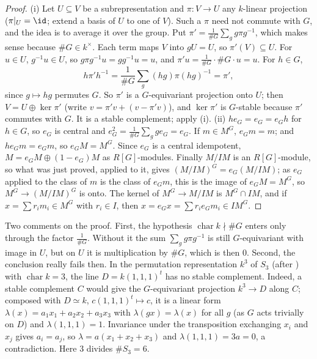 \begin{proof}
(i) Let $U\subseteq V$ be a subrepresentation and $\pi\colon V\to U$ any $k$-linear projection ($\pi|_U=\id$; extend a basis of $U$ to one of
$V$). Such a $\pi$ need not commute with $G$, and the idea is to average it over the group. Put $\pi'=\frac1{\#G}\sum_gg\pi g^{-1}$, which makes
sense because $\#G\in k^\times$. Each term maps $V$ into $gU=U$, so $\pi'(V)\subseteq U$. For $u\in U$, $g^{-1}u\in U$, so $g\pi g^{-1}u=gg^{-1}u=u$, and
$\pi'u=\frac1{\#G}\cdot\#G\cdot u=u$. For $h\in G$,
\[
h\pi'h^{-1}=\frac1{\#G}\sum_g(hg)\pi(hg)^{-1}=\pi',
\]
since $g\mapsto hg$ permutes $G$. So $\pi'$ is a $G$-equivariant projection onto $U$; then $V=U\oplus\ker\pi'$ (write $v=\pi'v+(v-\pi'v)$), and
$\ker\pi'$ is $G$-stable because $\pi'$ commutes with $G$. It is a stable complement; apply (i).
(ii) $he_G=e_G=e_Gh$ for $h\in G$, so $e_G$ is central and $e_G^2=\frac1{\#G}\sum_gge_G=e_G$. If $m\in M^G$, $e_Gm=m$; and $he_Gm=e_Gm$, so
$e_GM=M^G$. Since $e_G$ is a central idempotent, $M=e_GM\oplus(1-e_G)M$ as $R[G]$-modules. Finally $M/IM$ is an $R[G]$-module, so what was just proved, applied to it, gives
$(M/IM)^G=e_G(M/IM)$; as $e_G$ applied to the class of $m$ is the class of $e_Gm$, this is the image of $e_GM=M^G$, so $M^G\to(M/IM)^G$ is onto.
The kernel of $M^G\to M/IM$ is $M^G\cap IM$, and if $x=\sum r_im_i\in M^G$ with $r_i\in I$, then
$x=e_Gx=\sum r_ie_Gm_i\in IM^G$.
\end{proof}

Two comments on the proof. First, the hypothesis $\operatorname{char}k\nmid\#G$ enters only through the factor $\frac1{\#G}$. Without it the sum
$\sum_gg\pi g^{-1}$ is still $G$-equivariant with image in $U$, but on $U$ it is multiplication by $\#G$, which is then $0$. Second, the
conclusion really fails then. In the permutation representation $k^3$ of $S_3$ (after ) with
$\operatorname{char}k=3$, the line $D=k(1,1,1)^t$ has no stable complement. Indeed, a stable complement $C$ would give the $G$-equivariant
projection $k^3\to D$ along $C$; composed with $D\simeq k$, $c(1,1,1)^t\mapsto c$, it is a linear form $\lambda(x)=a_1x_1+a_2x_2+a_3x_3$ with
$\lambda(gx)=\lambda(x)$ for all $g$ (as $G$ acts trivially on $D$) and $\lambda(1,1,1)=1$. Invariance under the transposition exchanging $x_i$ and
$x_j$ gives $a_i=a_j$, so $\lambda=a(x_1+x_2+x_3)$ and $\lambda(1,1,1)=3a=0$, a contradiction. Here $3$ divides $\#S_3=6$.

